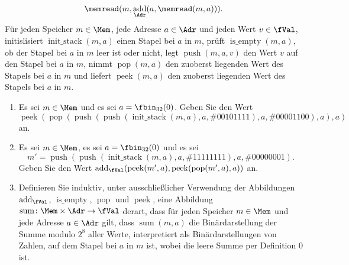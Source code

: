\documentclass[12pt]{article}
\DeclareMathOperator{\add}{add}
\DeclareMathOperator{\stack}{init\_stack}
\DeclareMathOperator{\emptyX}{is\_empty}
\DeclareMathOperator{\push}{push}
\DeclareMathOperator{\pushall}{push\_all}
\DeclareMathOperator{\pop}{pop}
\DeclareMathOperator{\peek}{peek}
\DeclareMathOperator{\sumX}{sum}
\begin{document}
\begin{aufgabe}[1 + 1 + 4 = 6]
\begin{align*}
                                             \memread(m, \add_{\Adr}(a, \memread(m, a))).%
  \end{align*}
  Für jeden Speicher $m \in \Mem$, jede Adresse $a \in \Adr$ und jeden Wert $v \in \fVal$, initislisiert $\stack(m, a)$ einen Stapel bei $a$ in $m$, prüft $\emptyX(m, a)$, ob der Stapel bei $a$ in $m$ leer ist oder nicht, legt $\push(m, a, v)$ den Wert $v$ auf den Stapel bei $a$ in $m$, nimmt $\pop(m, a)$ den zuoberst liegenden Wert des Stapels bei $a$ in $m$ und liefert $\peek(m, a)$ den zuoberst liegenden Wert des Stapels bei $a$ in $m$.
  \begin{enumerate}
    \item Es sei $m \in \Mem$ und es sei $a = \fbin_{32}(0)$. Geben Sie den Wert
          \begin{equation*}
            \peek(\pop(\push(\push(\stack(m, a), a, \#{00101111}), a, \#{00001100}), a), a)
          \end{equation*}
          an.
    \item Es sei $m \in \Mem$, es sei $a = \fbin_{32}(0)$ und es sei
          \begin{equation*}
            m' = \push(\push(\stack(m, a), a, \#{11111111}), a, \#{00000001}).
          \end{equation*}
          Geben Sie den Wert $\add_{\fVal}(\peek(m', a), \peek(\pop(m', a), a))$ an.
    \item Definieren Sie induktiv, unter ausschließlicher Verwendung der Abbildungen $\add_{\fVal}$, $\emptyX$, $\pop$ und $\peek$, eine Abbildung $\sumX \colon \Mem \times \Adr \to \fVal$ derart, dass für jeden Speicher $m \in \Mem$ und jede Adresse $a \in \Adr$ gilt, dass $\sumX(m, a)$ die Binärdarstellung der Summe modulo $2^8$ aller Werte, interpretiert als Binärdarstellungen von Zahlen, auf dem Stapel bei $a$ in $m$ ist, wobei die leere Summe per Definition $0$ ist.
  \end{enumerate}
\end{aufgabe}
\end{document}
